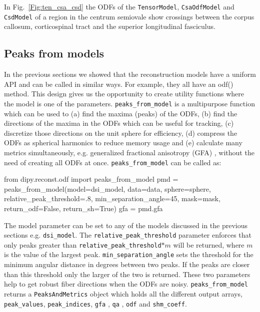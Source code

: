 \documentclass{bioinfo}
\begin{document}
In Fig.~\ref{Fig:ten_csa_csd} the ODFs of the \texttt{TensorModel},
\texttt{CsaOdfModel} and \texttt{CsdModel} of a region in the
centrum semiovale show crossings between the corpus callosum,
corticospinal tract and the superior longitudinal fasciculus.

\subsection{Peaks from models}
In the previous sections we showed that the reconstruction models have a
uniform API and can be called in similar ways. For example, they all have an
odf() method. This design gives us the opportunity to create utility functions
where the model is one of the parameters. \texttt{peaks\_from\_model} is a
multipurpose function which can be used to (a) find the maxima (peaks) of the
ODFs, (b) find the directions of the maxima in the ODFs which can be useful for
tracking, (c) discretize those directions on the unit sphere for efficiency, (d)
compress the ODFs as spherical harmonics to reduce memory usage and (e)
calculate many metrics simultaneously, e.g. generalized fractional anisotropy
(GFA) \citep{tuch:04}, without the need of creating all ODFs at
once. \texttt{peaks\_from\_model} can be called as:
\begin{python}
from dipy.reconst.odf import peaks_from_model
pmd = peaks_from_model(model=dsi_model,
                       data=data,
                       sphere=sphere,
                       relative_peak_threshold=.8,
                       min_separation_angle=45,
                       mask=mask,
                       return_odf=False,
                       return_sh=True)
gfa = pmd.gfa
\end{python}
The model parameter can be set to any of the models discussed in the previous sections
e.g. \texttt{dsi\_model}. The \texttt{relative\_peak\_threshold} parameter
enforces that only peaks greater than \texttt{relative\_peak\_threshold}$*m$
will be returned, where $m$ is the value of the largest
peak. \texttt{min\_separation\_angle} sets the threshold for the minimum
angular distance in degrees between two peaks. If the peaks are closer than
this threshold only the larger of the two is returned. These two parameters help
to get robust fiber directions when the ODFs are
noisy. \texttt{peaks\_from\_model} returns a \texttt{PeaksAndMetrics} object
which holds all the different output arrays, \texttt{peak\_values},
\texttt{peak\_indices}, \texttt{gfa} , \texttt{qa}
\citep{yeh-etal:10}, \texttt{odf} and \texttt{shm\_coeff}.
\end{document}
